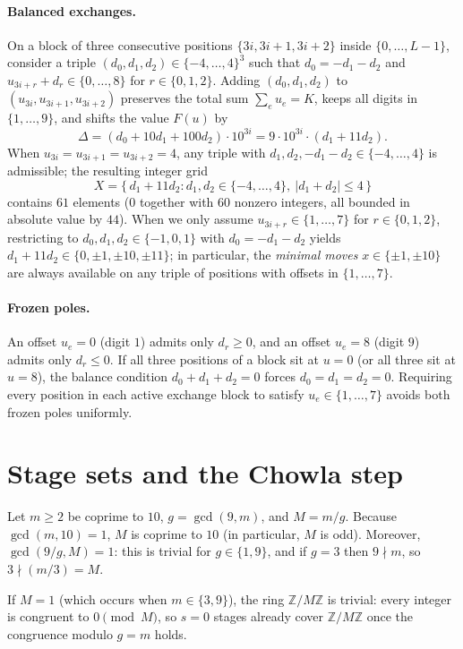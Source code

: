 \documentclass[11pt]{article}
\theoremstyle{remark}
\newcommand{\Z}{\mathbb{Z}}
\begin{document}
\paragraph{Balanced exchanges.} On a block of three consecutive positions
$\{3i,3i+1,3i+2\}$ inside $\{0,\dots,L-1\}$, consider a triple
$(d_0,d_1,d_2) \in \{-4,\dots,4\}^3$ such that $d_0 = -d_1 - d_2$ and
$u_{3i+r} + d_r \in \{0,\dots,8\}$ for $r \in \{0,1,2\}$. Adding $(d_0,d_1,d_2)$
to $(u_{3i},u_{3i+1},u_{3i+2})$ preserves the total sum $\sum_e u_e = K$, keeps
all digits in $\{1,\dots,9\}$, and shifts the value $F(u)$ by
\[
 \Delta = (d_0 + 10 d_1 + 100 d_2)\cdot 10^{3i}
 = 9\cdot 10^{3i}\cdot(d_1 + 11 d_2).
\]
When $u_{3i} = u_{3i+1} = u_{3i+2} = 4$, any triple with $d_1, d_2, -d_1-d_2 \in
\{-4,\dots,4\}$ is admissible; the resulting integer grid
\[
 X = \{\, d_1 + 11 d_2 : d_1, d_2 \in \{-4,\dots,4\},\ |d_1+d_2| \le 4 \,\}
\]
contains $61$ elements ($0$ together with $60$ nonzero integers, all bounded in
absolute value by $44$). When we only assume $u_{3i+r} \in \{1,\dots,7\}$ for
$r \in \{0,1,2\}$, restricting to $d_0,d_1,d_2 \in \{-1,0,1\}$ with
$d_0 = -d_1 - d_2$ yields $d_1 + 11 d_2 \in \{0, \pm 1, \pm 10, \pm 11\}$; in
particular, the \emph{minimal moves} $x \in \{\pm 1, \pm 10\}$ are always
available on any triple of positions with offsets in $\{1,\dots,7\}$.

\paragraph{Frozen poles.} An offset $u_e = 0$ (digit $1$) admits only $d_r \ge 0$,
and an offset $u_e = 8$ (digit $9$) admits only $d_r \le 0$. If all three
positions of a block sit at $u = 0$ (or all three sit at $u = 8$), the balance
condition $d_0 + d_1 + d_2 = 0$ forces $d_0 = d_1 = d_2 = 0$. Requiring every
position in each active exchange block to satisfy $u_e \in \{1,\dots,7\}$ avoids
both frozen poles uniformly.

\section{Stage sets and the Chowla step}
\label{sec:stages}

Let $m \ge 2$ be coprime to $10$, $g = \gcd(9,m)$, and $M = m/g$. Because
$\gcd(m,10) = 1$, $M$ is coprime to $10$ (in particular, $M$ is odd). Moreover,
$\gcd(9/g, M) = 1$: this is trivial for $g \in \{1,9\}$, and if $g = 3$ then
$9 \nmid m$, so $3 \nmid (m/3) = M$.

If $M = 1$ (which occurs when $m \in \{3,9\}$), the ring $\Z/M\Z$ is trivial:
every integer is congruent to $0 \pmod M$, so $s = 0$ stages already cover
$\Z/M\Z$ once the congruence modulo $g = m$ holds.
\end{document}
